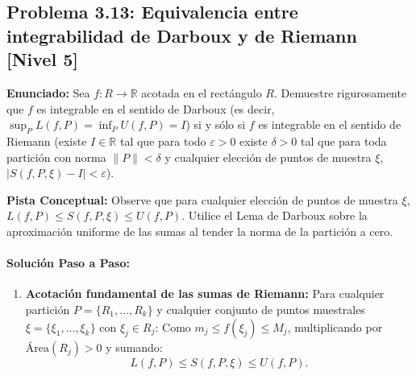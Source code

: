 \documentclass[11pt,a4paper]{article}
\begin{document}
\subsection*{Problema 3.13: Equivalencia entre integrabilidad de Darboux y de Riemann \hfill \color{primaryblue}\small[Nivel 5]}

\begin{tcolorbox}[colback=white,colframe=gray!40,arc=1mm,boxrule=0.5pt,left=3mm,right=3mm,top=2mm,bottom=2mm]
\textbf{Enunciado:} Sea $f: R \to \mathbb{R}$ acotada en el rectángulo $R$. Demuestre rigurosamente que $f$ es integrable en el sentido de Darboux (es decir, $\sup_P L(f,P) = \inf_P U(f,P) = I$) si y sólo si $f$ es integrable en el sentido de Riemann (existe $I \in \mathbb{R}$ tal que para todo $\varepsilon > 0$ existe $\delta > 0$ tal que para toda partición con norma $\|P\| < \delta$ y cualquier elección de puntos de muestra $\xi$, $|S(f, P, \xi) - I| < \varepsilon$).
\end{tcolorbox}

\begin{tcolorbox}[colback=yellow!4,colframe=accentamber!70,arc=1mm,boxrule=0.5pt,left=3mm,right=3mm,top=1.5mm,bottom=1.5mm]
\textbf{Pista Conceptual:} Observe que para cualquier elección de puntos de muestra $\xi$, $L(f,P) \le S(f,P,\xi) \le U(f,P)$. Utilice el Lema de Darboux sobre la aproximación uniforme de las sumas al tender la norma de la partición a cero.
\end{tcolorbox}

\paragraph{Solución Paso a Paso:}\par
\begin{enumerate}[label=\textbf{\arabic*.}]
\item \textbf{Acotación fundamental de las sumas de Riemann:}
Para cualquier partición $P = \{R_1, \dots, R_k\}$ y cualquier conjunto de puntos muestrales $\xi = \{\xi_1, \dots, \xi_k\}$ con $\xi_j \in R_j$:
Como $m_j \le f(\xi_j) \le M_j$, multiplicando por $\text{Área}(R_j) > 0$ y sumando:
\begin{equation*}
L(f, P) \le S(f, P, \xi) \le U(f, P).
\end{equation*}
\end{enumerate}
\end{document}
